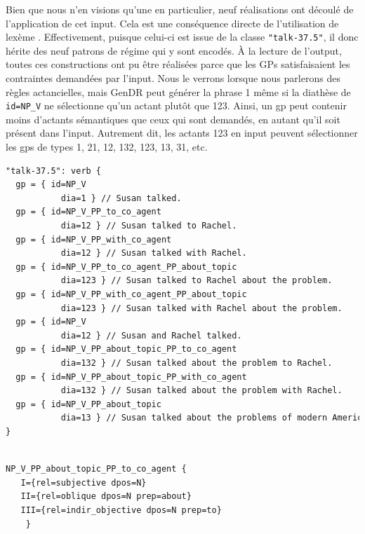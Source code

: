 Bien que nous n'en visions qu'une en particulier, neuf réalisations ont découlé de l'application de cet input. Cela est une conséquence directe de l'utilisation de lexème . Effectivement, puisque celui-ci est issue de la classe \texttt{"talk-37.5"}, il donc hérite des neuf patrons de régime qui y sont encodés. À la lecture de l'output, toutes ces constructions ont pu être réalisées parce que les \acp{GP} satisfaisaient les contraintes demandées par l'input. Nous le verrons lorsque nous parlerons des règles actancielles, mais GenDR peut générer la phrase 1 même si la diathèse de \texttt{id=NP\_V} ne sélectionne qu'un actant plutôt que 123. Ainsi, un gp peut contenir moins d'actants sémantiques que ceux qui sont demandés, en autant qu'il soit présent dans l'input. Autrement dit, les actants 123 en input peuvent sélectionner les gps de types 1, 21, 12, 132, 123, 13, 31, etc. 

\begin{minipage}{\linewidth}
\begin{lstlisting}[language=XML, caption=Classe \texttt{talk-37.5}]
"talk-37.5": verb {
  gp = { id=NP_V
	       dia=1 } // Susan talked.
  gp = { id=NP_V_PP_to_co_agent
	       dia=12 } // Susan talked to Rachel.
  gp = { id=NP_V_PP_with_co_agent
	       dia=12 } // Susan talked with Rachel.
  gp = { id=NP_V_PP_to_co_agent_PP_about_topic
	       dia=123 } // Susan talked to Rachel about the problem.
  gp = { id=NP_V_PP_with_co_agent_PP_about_topic
	       dia=123 } // Susan talked with Rachel about the problem.
  gp = { id=NP_V
	       dia=12 } // Susan and Rachel talked.
  gp = { id=NP_V_PP_about_topic_PP_to_co_agent
	       dia=132 } // Susan talked about the problem to Rachel.
  gp = { id=NP_V_PP_about_topic_PP_with_co_agent
	       dia=132 } // Susan talked about the problem with Rachel.
  gp = { id=NP_V_PP_about_topic
	       dia=13 } // Susan talked about the problems of modern America.
}
\end{lstlisting}
\end{minipage}

\begin{minipage}{\linewidth}
\begin{lstlisting}[language=XML, caption=Propriétés syntaxiques de \texttt{NP\_V\_PP\_about\_topic\_PP\_to\_co\_agent} , label=gpexemple]

NP_V_PP_about_topic_PP_to_co_agent {
   I={rel=subjective dpos=N}
   II={rel=oblique dpos=N prep=about}
   III={rel=indir_objective dpos=N prep=to}
	}
\end{lstlisting}
\end{minipage}

